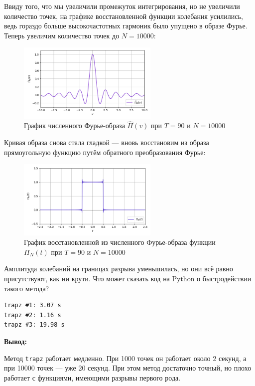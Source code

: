 \documentclass[a4paper]{article}
\begin{document}
Ввиду того, что мы увеличили промежуток интегрирования, но не увеличили количество точек, на графике восстановленной функции колебания усилились, ведь гораздо больше высокочастотных гармоник было упущено в образе Фурье.\\[0.5em]
Теперь увеличим количество точек до $N = 10000$:
\begin{figure}[H]
    \centering \includegraphics[width=0.6\textwidth]{sources/first/part1/T=90 density=10000/3_num_image.png}
    \caption{График численного Фурье-образа $\hat{\Pi}(v)$ при $T = 90$ и $N = 10000$}
\end{figure}
Кривая образа снова стала гладкой --- вновь восстановим из образа прямоугольную функцию путём обратного преобразования Фурье:
\begin{figure}[H]
    \centering \includegraphics[width=0.6\textwidth]{sources/first/part1/T=90 density=10000/4_num_restored.png}
    \caption{График восстановленной из численного Фурье-образа функции $\Pi_N(t)$ при $T = 90$ и $N = 10000$}
\end{figure}
Амплитуда колебаний на границах разрыва уменьшилась, но они всё равно присутствуют, как ни крути. Что может сказать код на Python о быстродействии такого метода?
\begin{center}
    \begin{minipage}{0.3\textwidth}
        \begin{lstlisting}
trapz #1: 3.07 s
trapz #2: 1.16 s
trapz #3: 19.98 s
\end{lstlisting}
    \end{minipage}
\end{center}
\textbf{Вывод:}
\begin{quotebox}
    Метод \texttt{trapz} работает медленно. При 1000 точек он работает около 2 секунд, а при 10000 точек --- уже 20 секунд. При этом метод достаточно точный, но плохо работает с функциями, имеющими разрывы первого рода.
\end{quotebox} \newpage
\end{document}
